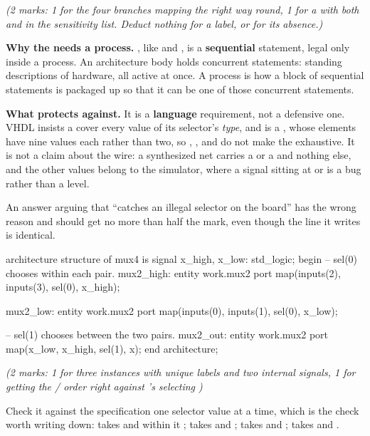 \noindent\textit{(2 marks: 1 for the four branches mapping the right way round, 1 for a
 with both  and  in the sensitivity list. Deduct nothing for a
label, or for its absence.)}

\textbf{Why the  needs a process.} , like  and , is a
\textbf{sequential} statement, legal only inside a process. An architecture body holds concurrent
statements: standing descriptions of hardware, all active at once. A process is how a block of
sequential statements is packaged up so that it can be one of those concurrent statements.

\textbf{What  protects against.} It is a \textbf{language} requirement, not a
defensive one. VHDL insists a  cover every value of its selector's \emph{type}, and
 is a , whose elements have nine values each rather than two, so
, ,  and  do not make the  exhaustive. It is
not a claim about the wire: a synthesized net carries a  or a  and nothing else, and
the other values belong to the simulator, where a signal sitting at  or  is a
bug rather than a level. 

An answer arguing that  ``catches an illegal selector on the board'' has the wrong
reason and should get no more than half the mark, even though the line it writes is identical.

\begin{vhdlcode}
architecture structure of mux4 is
signal x_high, x_low: std_logic;
begin
    -- sel(0) chooses within each pair.
    mux2_high: entity work.mux2
        port map(inputs(2), inputs(3), sel(0), x_high);

    mux2_low: entity work.mux2
        port map(inputs(0), inputs(1), sel(0), x_low);

    -- sel(1) chooses between the two pairs.
    mux2_out: entity work.mux2
        port map(x_low, x_high, sel(1), x);
end architecture;
\end{vhdlcode}

\noindent\textit{(2 marks: 1 for three instances with unique labels and two internal signals, 1 for
getting the / order right against 's  selecting
)}

Check it against the specification one selector value at a time, which is the check worth writing
down:  takes  and within it ;  takes
 and ;  takes  and ;
 takes  and .

